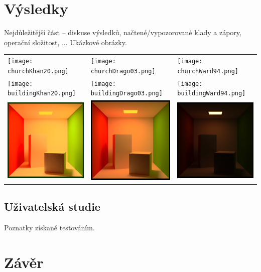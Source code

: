 \documentclass[11pt,a4paper,oneside]{article}
\begin{document}
\section{Výsledky}
Nejdůležitější část -- diskuse výsledků, 
načtené/vypozorované klady a zápory, operační složitost, ...
Ukázkové obrázky.

\begin{tabular}{lll}
    \texttt{[image: churchKhan20.png]} &
    \texttt{[image: churchDrago03.png]} &
    \texttt{[image: churchWard94.png]} \\
\texttt{[image: buildingKhan20.png]} &
    \texttt{[image: buildingDrago03.png]} &
    \texttt{[image: buildingWard94.png]}\\
\includegraphics[width=.3\linewidth,valign=m]{cornell_boxKhan20.png} &
    \includegraphics[width=.3\linewidth,valign=m]{cornell_boxDrago03.png} &
    \includegraphics[width=.3\linewidth,valign=m]{cornell_boxWard94.png}\\
\end{tabular}

\subsection{Uživatelská studie}

Poznatky získané testováním.


\section{Závěr}



\end{document}
